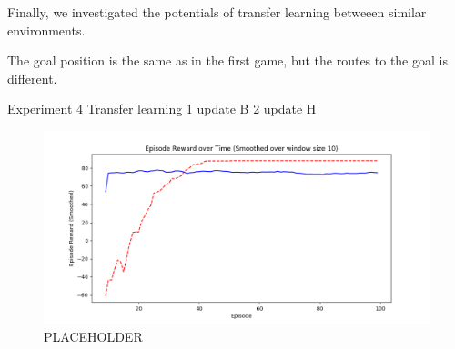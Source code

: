 Finally, we investigated the potentials of transfer learning betweeen similar environments. 

The goal position is the same as in the first game, but the routes to the goal is different. 

Experiment 4 Transfer learning 
    1 update B
    2 update H


\begin{figure}[!htb]
\centering
\includegraphics[width=1.0\textwidth]{./figures/placeholder}
\caption{PLACEHOLDER}
\label{proposed_architecture}
\end{figure}








